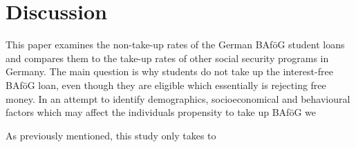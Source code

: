 \section{Discussion}
%
%
This paper examines the non-take-up rates of the German BAföG student loans and compares them to the take-up rates of other social security programs in Germany.
The main question is why students do not take up the interest-free BAföG loan, even though they are eligible which essentially is rejecting free money. 
In an attempt to identify demographics, socioeconomical and behavioural factors which may affect the individuals propensity to take up BAföG we 


%
%



%
%



%
%



%
%



%
%

As previously mentioned, this study only takes to 

%
%


